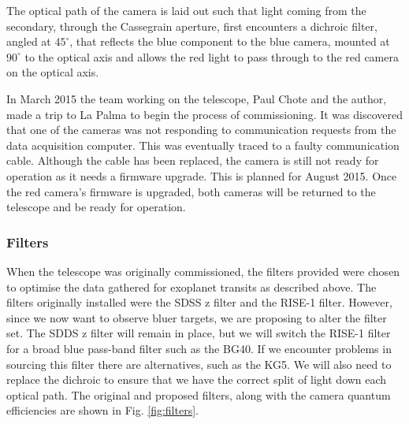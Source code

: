 \documentclass[a4paper,fleqn,usenatbib]{mnras}
\begin{document}
The optical path of the camera is laid out such that light coming from the secondary, through the Cassegrain aperture, first encounters a dichroic filter, angled at $45^\circ$, that reflects the blue component to the blue camera, mounted at $90^\circ$ to the optical axis and allows the red light to pass through to the red camera on the optical axis. 

In March 2015 the team working on the telescope, Paul Chote and the author, made a trip to La Palma to begin the process of commissioning. It was discovered that one of the cameras was not responding to communication requests from the data acquisition computer. This was eventually traced to a faulty communication cable. Although the cable has been replaced, the camera is still not ready for operation as it needs a firmware upgrade. This is planned for August 2015. Once the red camera's firmware is upgraded, both cameras will be returned to the telescope and be ready for operation. 

\subsubsection{Filters}
When the telescope was originally commissioned, the filters provided were chosen to optimise the data gathered for exoplanet transits as described above. The filters originally installed were the SDSS z filter and the RISE-1 filter. However, since we now want to observe bluer targets, we are proposing to alter the filter set. The SDDS z filter will remain in place, but we will switch the RISE-1 filter for a broad blue pass-band filter such as the BG40. If we encounter problems in sourcing this filter there are alternatives, such as the KG5. We will also need to replace the dichroic to ensure that we have the correct split of light down each optical path.  The original and proposed filters, along with the camera quantum efficiencies are shown in Fig. \ref{fig:filters}.
\end{document}
